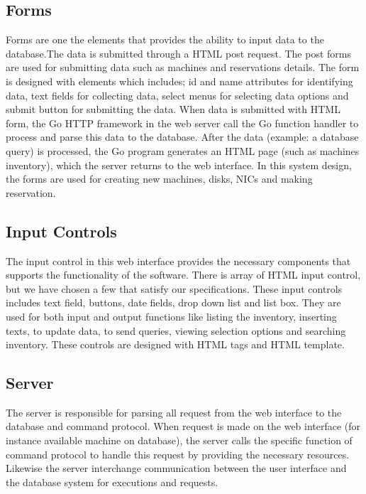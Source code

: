 \subsection*{Forms}
 Forms are one the elements that provides the ability to input data to the database.The data is submitted through a HTML post request. The post forms are used for submitting data such as machines and reservations details. The form is designed with elements which includes; id and name attributes for identifying data, text fields for collecting data, select menus for selecting data options and submit button for submitting the data. When data is submitted with HTML form, the Go HTTP framework in the web server call the Go function handler to process and parse this data to the database.  After the data (example: a database query) is processed, the Go program generates an HTML page (such as machines inventory), which the server returns to the web interface. In this system design, the forms are used for creating new machines, disks, NICs and making reservation. 
 
\subsection*{Input Controls}
The input control in this web interface provides the necessary components that supports the functionality of the software. There is array of HTML input control, but we have chosen a few that satisfy our specifications. These input controls includes text field, buttons, date fields, drop down list and list box. They are used for both input and output functions like listing the inventory, inserting texts, to update data, to send queries, viewing selection options and searching inventory. These controls are designed with HTML tags and HTML template.

\subsection{Server}
The server is responsible for parsing all request from the web interface to the database and command protocol. When request is made on the web interface (for instance available machine on database), the server calls the  specific function of command protocol to handle this request by providing the necessary resources. Likewise the server interchange communication between the user interface and the database system for executions and requests. 

